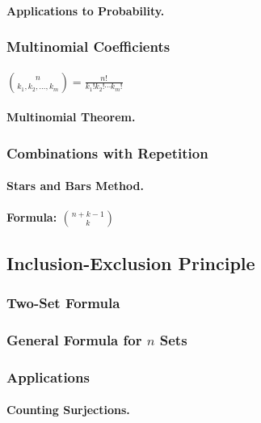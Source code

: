 \paragraph{Applications to Probability.}

\subsubsection{Multinomial Coefficients}
\paragraph{$\binom{n}{k_1, k_2, \ldots, k_m} = \frac{n!}{k_1! k_2! \cdots k_m!}$}
\paragraph{Multinomial Theorem.}

\subsubsection{Combinations with Repetition}
\paragraph{Stars and Bars Method.}
\paragraph{Formula: $\binom{n+k-1}{k}$}

\subsection{Inclusion-Exclusion Principle}
\label{subsec:inclusion-exclusion}

\subsubsection{Two-Set Formula}
\subsubsection{General Formula for $n$ Sets}
\subsubsection{Applications}
\paragraph{Counting Surjections.}
